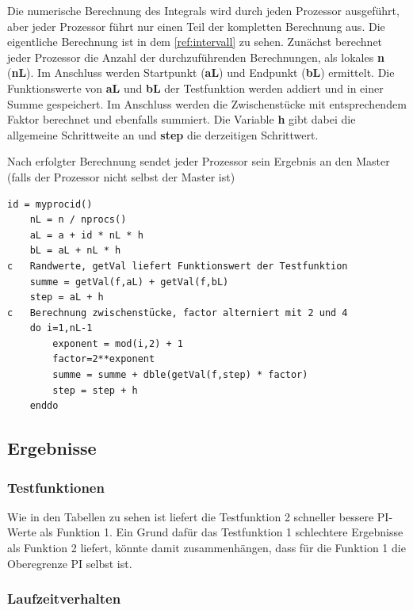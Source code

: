 Die numerische Berechnung des Integrals wird durch jeden Prozessor ausgeführt, aber jeder Prozessor führt nur einen Teil der kompletten Berechnung aus.
Die eigentliche Berechnung ist in dem \autoref{ref:intervall} zu sehen.
Zunächst berechnet jeder Prozessor die Anzahl der durchzuführenden Berechnungen, als lokales \textbf{n} (\textbf{nL}).
Im Anschluss werden Startpunkt (\textbf{aL}) und Endpunkt (\textbf{bL}) ermittelt.
Die Funktionswerte von \textbf{aL} und \textbf{bL} der Testfunktion werden addiert und in einer Summe gespeichert.
Im Anschluss werden die Zwischenstücke mit entsprechendem Faktor berechnet und ebenfalls summiert.
Die Variable \textbf{h} gibt dabei die allgemeine Schrittweite an und \textbf{step} die derzeitigen Schrittwert.

Nach erfolgter Berechnung sendet jeder Prozessor sein Ergebnis an den Master (falls der Prozessor nicht selbst der Master ist)

\begin{lstlisting}[caption=Berechnen der relevanten Bereiche für jeden Prozessor\label{ref:intervall}]
	id = myprocid() 
	nL = n / nprocs()
	aL = a + id * nL * h
	bL = aL + nL * h
c	Randwerte, getVal liefert Funktionswert der Testfunktion
	summe = getVal(f,aL) + getVal(f,bL)   
	step = aL + h
c 	Berechnung zwischenstücke, factor alterniert mit 2 und 4
	do i=1,nL-1
		exponent = mod(i,2) + 1
		factor=2**exponent
		summe = summe + dble(getVal(f,step) * factor)
		step = step + h    
	enddo
\end{lstlisting}

\subsection{Ergebnisse}

\subsubsection{Testfunktionen}

Wie in den Tabellen zu sehen ist liefert die Testfunktion 2 schneller bessere PI-Werte als Funktion 1.
Ein Grund dafür das Testfunktion 1 schlechtere Ergebnisse als Funktion 2 liefert, könnte damit zusammenhängen, dass für die Funktion 1 die Oberegrenze PI selbst ist.

\subsubsection{Laufzeitverhalten}
